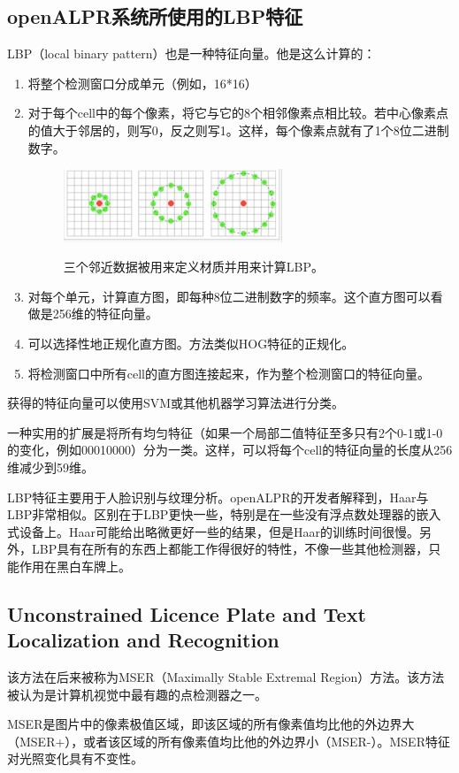 \subsection{openALPR系统所使用的LBP特征}
LBP（local binary pattern）也是一种特征向量。他是这么计算的：
\begin{enumerate}
\item
将整个检测窗口分成单元（例如，16*16）
\item
对于每个cell中的每个像素，将它与它的8个相邻像素点相比较。若中心像素点的值大于邻居的，则写0，反之则写1。这样，每个像素点就有了1个8位二进制数字。
\begin{figure}[H]
    \centering 
    \includegraphics[width=0.618\textwidth]{image/2_3_1.jpg}    
    \label{logic}
    \caption{三个邻近数据被用来定义材质并用来计算LBP。}
\end{figure}
\item
对每个单元，计算直方图，即每种8位二进制数字的频率。这个直方图可以看做是256维的特征向量。
\item
可以选择性地正规化直方图。方法类似HOG特征的正规化。
\item
将检测窗口中所有cell的直方图连接起来，作为整个检测窗口的特征向量。
\end{enumerate}
获得的特征向量可以使用SVM或其他机器学习算法进行分类。

一种实用的扩展是将所有均匀特征（如果一个局部二值特征至多只有2个0-1或1-0的变化，例如00010000）分为一类。这样，可以将每个cell的特征向量的长度从256维减少到59维。

LBP特征主要用于人脸识别与纹理分析。openALPR的开发者解释到，Haar与LBP非常相似。区别在于LBP更快一些，特别是在一些没有浮点数处理器的嵌入式设备上。Haar可能给出略微更好一些的结果，但是Haar的训练时间很慢。另外，LBP具有在所有的东西上都能工作得很好的特性，不像一些其他检测器，只能作用在黑白车牌上。
\subsection{Unconstrained Licence Plate and Text Localization and Recognition}
该方法\cite{un_lic_plate_and_text}在后来被称为MSER（Maximally Stable Extremal Region）方法。该方法被认为是计算机视觉中最有趣的点检测器之一。

MSER是图片中的像素极值区域，即该区域的所有像素值均比他的外边界大（MSER+），或者该区域的所有像素值均比他的外边界小（MSER-）。MSER特征对光照变化具有不变性。

